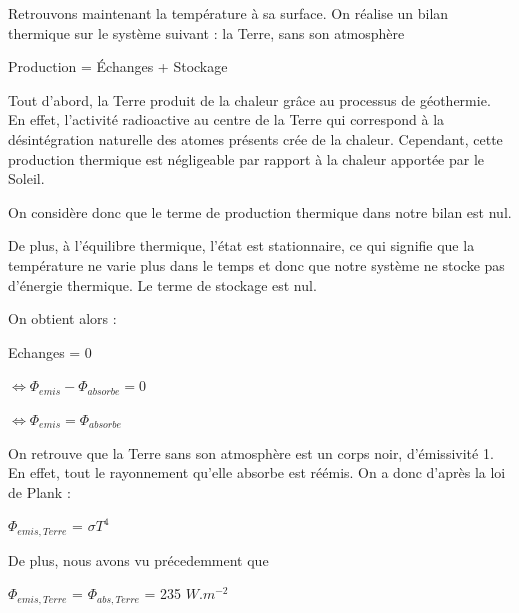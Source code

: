 \documentclass[a4paper, 12pt]{report} %
\begin{document}
\par 
\vspace{\baselineskip}
\vspace{\baselineskip}

Retrouvons maintenant la température à sa surface.
On réalise un bilan thermique sur le système suivant : 
la Terre, sans son atmosphère
\begin{center}
    Production = Échanges + Stockage 
\end{center} \vspace{\baselineskip}

Tout d'abord, la Terre produit de la chaleur grâce au processus de géothermie. En effet, l’activité radioactive au centre de la Terre qui correspond à la désintégration naturelle des atomes présents crée de la chaleur. 
Cependant, cette production thermique est négligeable par rapport à la chaleur apportée par le Soleil. 

\noindent On considère donc que le terme de production thermique dans notre bilan est nul. \vspace{\baselineskip}

De plus, à l’équilibre thermique, l’état est stationnaire, ce qui signifie que la température ne varie plus dans le temps et donc que notre système ne stocke pas d’énergie thermique. Le terme de stockage est nul.

\noindent On obtient alors :
\begin{center}
    Echanges = 0
\end{center}

\begin{center}
    $\Leftrightarrow \Phi_{emis} - \Phi_{absorbe}  = 0$
\end{center}

\begin{center}
    $\Leftrightarrow \Phi_{emis} = \Phi_{absorbe}$
\end{center} \vspace{\baselineskip}

On retrouve que la Terre sans son atmosphère est un corps noir, d’émissivité 1. En effet, tout le rayonnement qu’elle absorbe est réémis. On a donc d'après la loi de Plank :
\begin{center}
$\Phi_{emis,Terre}$ = $\sigma T^{4}$
\end{center} \vspace{\baselineskip}

De plus, nous avons vu précedemment que
\begin{center}
$\Phi_{emis,Terre}$ = $\Phi_{abs,Terre}$  = 235 $W.m^{-2}$
\end{center} \vspace{\baselineskip}
\end{document}
